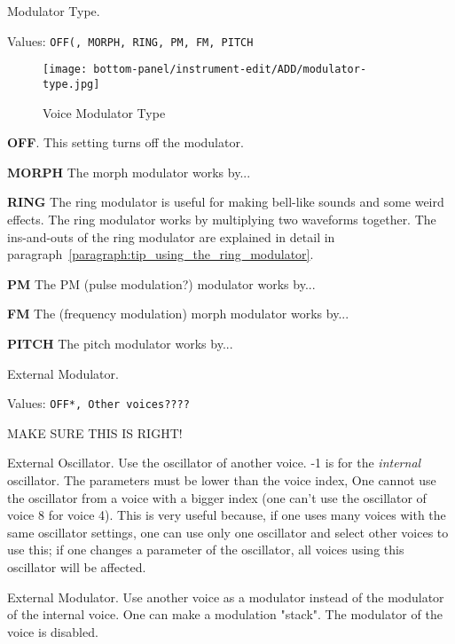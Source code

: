    \setcounter{ItemCounter}{0}      %

   Modulator Type.

   Values: \texttt{OFF(, MORPH, RING, PM, FM, PITCH}

\begin{figure}[H]
   \centering 
   \texttt{[image: bottom-panel/instrument-edit/ADD/modulator-type.jpg]}
   \caption{Voice Modulator Type}
   \label{fig:voice_modulator_type}
\end{figure}

   \begin{enumber}
      \item \textbf{OFF}.
      This setting turns off the modulator.
      \item \textbf{MORPH}
      The morph modulator works by...
      \item \textbf{RING}
      The ring modulator is useful for making bell-like sounds and some weird
      effects.  The ring modulator works by multiplying two waveforms
      together.  The ins-and-outs of the ring modulator are explained in
      detail in paragraph~\ref{paragraph:tip_using_the_ring_modulator}.
      \item \textbf{PM}
      The PM (pulse modulation?) modulator works by...
      \item \textbf{FM}
      The (frequency modulation) morph modulator works by...
      \item \textbf{PITCH}
      The pitch modulator works by...
   \end{enumber}

   External Modulator.

   Values: \texttt{OFF*, Other voices????}

   MAKE SURE THIS IS RIGHT!

   External Oscillator.
   Use the oscillator of another voice. -1 is for the
   \textsl{internal} oscillator.
   The parameters must be lower than the voice index, One cannot use the
   oscillator from a voice with a bigger index (one can't use the oscillator
   of voice 8 for voice 4). This is very useful because, if one uses
   many voices with the same oscillator settings, one can use only one
   oscillator and select other voices to use this; if one changes a parameter
   of the oscillator, all voices using this oscillator will be affected.

   External Modulator.
   Use another voice as a modulator instead of the modulator of the internal
   voice. One can make a modulation "stack". The modulator of the voice is
   disabled. 

